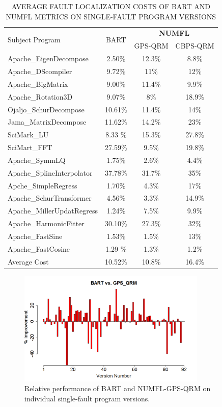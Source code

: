 \begin{table}[htbp!]
\caption{AVERAGE FAULT LOCALIZATION COSTS OF BART AND NUMFL METRICS ON SINGLE-FAULT PROGRAM VERSIONS}
\label{tableBARTvsNUMFL}
\centering
      \begin{tabular}{|l|c|c|c|}
      \hline
\multirow{2}{*}{Subject Program}	& \multirow{2}{*}{BART}&	\multicolumn{2}{|c|}{{\bf NUMFL}}	\\	\cline{3-4}
& & GPS-QRM	&CBPS-QRM \\ \hline
Apache\_EigenDecompose &	2.50\%&	12.3\%	&	8.8\%	\\	\hline
Apache\_DScompiler&	9.72\%&	11\%	&	12\%	\\	\hline
Apache\_BigMatrix	&	9.00\%&11.4\%	&	9.9\%	\\	\hline
Apache\_Rotation3D&	9.07\%&	8\%	&	18.9\%	\\	\hline
Ojaljo\_SchurDecompose&	10.61\%&	11.4\%	&	14\%	\\	\hline
Jama\_MatrixDecompose	&11.62\%&	14.2\%	&	23\%	\\	\hline
SciMark\_LU&8.33	\%&	15.3\%	&	27.8\%	\\	\hline
SciMart\_FFT&	 27.59\%&	9.5\%	&	19.8\%	\\	\hline
Apache\_SymmLQ&	 1.75\%&	2.6\%	&	4.4\%	\\	\hline
Apache\_SplineInterpolator&	 37.78\%&	31.7\%	&	35\%	\\	\hline
Apche\_SimpleRegress&	 1.70\%&	4.3\%	&	17\%	\\	\hline
Apache\_SchurTransformer&	 4.56\%&	3.3\%	&	14.9\%	\\	\hline
Apache\_MillerUpdatRegress&	 1.24\%&	7.5\%	&	9.9\%	\\	\hline
Apache\_HarmonicFitter&	30.10\%&	27.3\%	&	32\%	\\	\hline
Apache\_FastSine&	1.53\%&	1.5\%	&	13\%	\\	\hline
Apache\_FastCosine	&1.29	\%&1.3\%	&	1.2\%	\\	\hline
Average Cost	&	10.52\%&10.8\%	&	16.4\%	\\	\hline
\end{tabular}
\end{table}

\begin{figure}[!thpb]
\centering
\includegraphics[width=0.8\textwidth]{chapter4_BARTvsGPS_QRM.pdf}
\caption{Relative performance of BART and NUMFL-GPS-QRM on individual single-fault program versions.}
\label{BARTvsQRM}
\end{figure}

